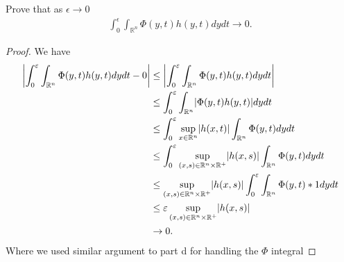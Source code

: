   \begin{exercise}[g]
   Prove that as $\epsilon \to 0$  
   \begin{align*}
     \int_0^{\epsilon} \int_{\mathbb{R}^{n} } \Phi(y,t)h(y,t) dy dt \to 0
   .\end{align*}
  \end{exercise}
  \begin{proof}
   We have 
   \begin{align*}
     \abs*{\int_0^{\epsilon} \int_{\mathbb{R}^{n} } \Phi(y,t)h(y,t) dy dt - 0} &\le \abs*{\int_0^{\epsilon} \int_{\mathbb{R}^{n} } \Phi(y,t)h(y,t) dy dt}\\
                                                                               &\le \int_0^{\epsilon} \int_{\mathbb{R}^{n} } \abs*{\Phi(y,t)h(y,t)} dy dt\\
                                                                               &\le  \int_0^{\epsilon}  \sup_{x \in  \mathbb{R}^{n} } \abs{h(x,t)} \int_{\mathbb{R}^{n} }\Phi(y,t) dy dt\\
                                                                               &\le  \int_0^{\epsilon}  \sup_{(x,s) \in  \mathbb{R}^{n} \times \mathbb{R}^{+}  } \abs{h(x,s)} \int_{\mathbb{R}^{n} }\Phi(y,t) dy dt\\
                                                                               &\le  \sup_{(x,s) \in  \mathbb{R}^{n} \times \mathbb{R}^{+}  } \abs{h(x,s)} \int_0^{\epsilon}  \int_{\mathbb{R}^{n} }\Phi(y,t) *1 dy dt\\
                                                                               &\le \epsilon \sup_{(x,s) \in  \mathbb{R}^{n} \times \mathbb{R}^{+}  } \abs{h(x,s)} \\
                                                                               &\to  0
   .\end{align*}
   Where we used similar argument to part d for handling the $\Phi $ integral
  \end{proof}
